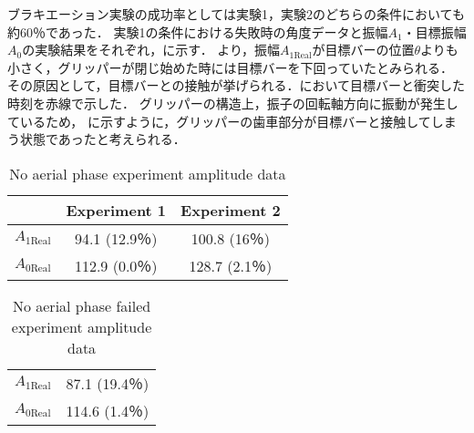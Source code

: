         ブラキエーション実験の成功率としては実験1，実験2のどちらの条件においても約60％であった．
        実験1の条件における失敗時の角度データと振幅$A_1$・目標振幅$A_0$の実験結果をそれぞれ，に示す．
        より，振幅$A_{\mathrm{1Real}}$が目標バーの位置$\theta$よりも小さく，グリッパーが閉じ始めた時には目標バーを下回っていたとみられる．
        その原因として，目標バーとの接触が挙げられる．において目標バーと衝突した時刻を赤線で示した．
        グリッパーの構造上，振子の回転軸方向に振動が発生しているため，
        に示すように，グリッパーの歯車部分が目標バーと接触してしまう状態であったと考えられる．
        \begin{table}[bh]
                \begin{center}
                  \caption{No aerial phase experiment amplitude data}
                  \vspace{2mm}
                  \begin{tabular}{c|cc}
                    \hline
                     & Experiment 1 & Experiment 2\\
                    \hline
                    $A_{\mathrm{1Real}}$ & 94.1 (12.9％)& 100.8 (16％)\\
                    $A_{\mathrm{0Real}}$ & 112.9 (0.0％)& 128.7 (2.1％)\\                      
                    \hline
                  \end{tabular}
                \end{center}
              \end{table}
        \newpage
        \clearpage
        \begin{table}[t]
                \begin{center}
                  \caption{No aerial phase failed experiment amplitude data}
                  \vspace{2mm}
                  \begin{tabular}{c|c}
                    \hline
                    $A_{\mathrm{1Real}}$ & 87.1 (19.4％)\\
                    $A_{\mathrm{0Real}}$ & 114.6 (1.4％)\\                      
                    \hline
                  \end{tabular}
                \end{center}
              \end{table}
        
              